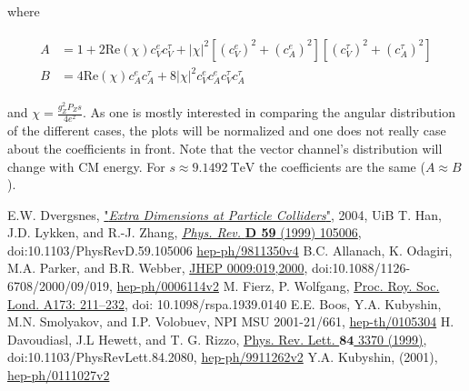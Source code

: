 \documentclass[11pt,a4paper]{article}
\begin{document}
where

\begin{align}
	\begin{split}
	A &= 1 + 2\text{Re}(\chi)c_V^ec_V^\tau + |\chi|^2\left[\left(c_V^e\right)^2 + \left(c_A^e\right)^2\right]\left[\left(c_V^\tau\right)^2 + \left(c_A^\tau\right)^2\right]\\
	B &= 4\text{Re}(\chi)c_A^ec_A^\tau + 8|\chi|^2 c_V^ec_A^ec_V^\tau c_A^\tau
	\end{split}
\end{align}

and $\chi = \frac{g_Z^2 P_Z s}{4e^2}$. As one is mostly interested in comparing the angular distribution of the different cases, the plots will be normalized and one does not really case about the coefficients in front. Note that the vector channel's distribution will change with CM energy. For $s\approx 9.1492\:\text{TeV}$ the coefficients are the same ($A\approx B$).


\begin{thebibliography}{9}
	E.W. Dvergsnes, \href{http://bora.uib.no/bitstream/handle/1956/847/THESIS.pdf?sequence=1}{"\emph{Extra Dimensions at Particle Colliders}"}, 2004, UiB
	T. Han, J.D. Lykken, and R.-J. Zhang,
	\href{http://journals.aps.org/prd/abstract/10.1103/PhysRevD.59.105006}{\emph{Phys. Rev.} {\bfseries D 59} (1999) 105006}, doi:10.1103/PhysRevD.59.105006 \href{http://xxx.lanl.gov/abs/hep-ph/9811350v4}{hep-ph/9811350v4}
	B.C. Allanach, K. Odagiri, M.A. Parker, and B.R. Webber,
	\href{http://iopscience.iop.org/article/10.1088/1126-6708/2000/09/019/meta;jsessionid=8B906F8B155A00E75050CBB02B18326C.c4.iopscience.cld.iop.org}{JHEP 0009:019,2000}, doi:10.1088/1126-6708/2000/09/019, \href{http://arxiv.org/abs/hep-ph/0006114v2}{hep-ph/0006114v2}
	M. Fierz, P. Wolfgang, \href{http://rspa.royalsocietypublishing.org/content/173/953/211}{Proc. Roy. Soc. Lond. A173: 211–232}, doi: 10.1098/rspa.1939.0140
	E.E. Boos, Y.A. Kubyshin, M.N. Smolyakov, and I.P. Volobuev, NPI MSU 2001-21/661, \href{http://arxiv.org/abs/hep-th/0105304}{hep-th/0105304}
	H. Davoudiasl, J.L Hewett, and T. G. Rizzo, \href{http://journals.aps.org/prl/abstract/10.1103/PhysRevLett.84.2080}{Phys. Rev. Lett. $\bm{84}$ 3370 (1999)}, doi:10.1103/PhysRevLett.84.2080, \href{http://arxiv.org/pdf/hep-ph/9911262v2.pdf}{hep-ph/9911262v2}
	Y.A. Kubyshin, (2001), \href{http://arxiv.org/abs/hep-ph/0111027v2}{hep-ph/0111027v2}
\end{thebibliography}
\end{document}
